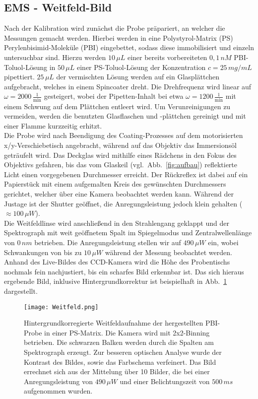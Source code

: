 \subsection{\label{subsec:A2}EMS - Weitfeld-Bild}
Nach der Kalibration wird zunächst die Probe präpariert, 
an welcher die Messungen gemacht werden. Hierbei werden in eine Polystyrol-Matrix (PS) 
Perylenbisimid-Moleküle (PBI) eingebettet, sodass diese immobilisiert und einzeln untersuchbar sind.
Hierzu werden $10\,\si{\mu L}$ einer bereits vorbereiteten $0,1\,\si{nM}$ PBI-Toluol-Lösung in 
$50\,\si{\mu L}$ einer PS-Toluol-Lösung der Konzentration $c=25\,\si{mg/mL}$ pipettiert. 
$25\,\si{\mu L}$ der vermischten Lösung werden auf ein Glasplättchen aufgebracht, welches in 
einem Spincoater dreht. Die Drehfrequenz wird linear auf $\omega=2000\,\si{\frac{1}{\text{min}}}$ 
gesteigert, wobei der Pipetten-Inhalt bei etwa $\omega=1200\,\si{\frac{1}{\text{min}}}$ mit 
einem Schwung auf dem Plättchen entleert wird. Um Verunreinigungen zu vermeiden, werden die benutzten 
Glasflaschen und -plättchen gereinigt und mit einer Flamme kurzzeitig erhitzt. \\
Die Probe wird nach Beendigung des Coating-Prozesses auf dem motorisierten x/y-Verschiebetisch angebracht, 
während auf das Objektiv das Immersionsöl geträufelt wird. Das Deckglas wird mithilfe eines Rädchens 
in den Fokus des Objektivs gefahren, bis das vom Glaskeil (vgl.~Abb.~\ref{fig:aufbau}) reflektierte Licht
einen vorgegebenen Durchmesser erreicht. Der Rückreflex ist dabei auf ein Papierstück mit einem aufgemalten 
Kreis des gewünschten Durchmessers gerichtet, welcher über eine Kamera beobachtet werden kann. 
Während der Justage ist der Shutter geöffnet, die Anregungsleistung jedoch klein gehalten 
($\approx 100\,\si{\mu W}$). \\
Die Weitfeldlinse wird anschließend in den Strahlengang geklappt und der Spektrograph mit weit 
geöffnetem Spalt im Spiegelmodus und Zentralwellenlänge von $0\,\si{nm}$ betrieben. 
Die Anregungsleistung stellen wir auf $490\,\si{\mu W}$ ein, 
wobei Schwankungen von bis zu $10\,\si{\mu W}$ während der Messung beobachtet werden. 
Anhand des Live-Bildes des CCD-Kamera wird die Höhe des Probentischs nochmals fein nachjustiert, 
bis ein scharfes Bild erkennbar ist. Das sich hieraus ergebende Bild, inklusive Hintergrundkorrektur
ist beispielhaft in Abb.~\ref{fig:weitfeldbild} dargestellt. 
\begin{figure}[h!]
    \centering
    \texttt{[image: Weitfeld.png]}
    \caption{\label{fig:weitfeldbild}Hintergrundkorregierte Weitfeldaufnahme der hergestellten 
    PBI-Probe in einer PS-Matrix. Die Kamera wird mit 2x2-Binning betrieben. Die schwarzen Balken 
    werden durch die Spalten am Spektrograph erzeugt. Zur besseren optischen Analyse wurde 
    der Kontrast des Bildes, sowie das Farbschema verfeinert.
    Das Bild errechnet sich aus der Mittelung über 10 Bilder, die bei einer Anregungsleistung von 
    $490\,\si{\mu W}$ und einer Belichtungszeit von $500\,\si{ms}$ aufgenommen wurden.}
\end{figure}\FloatBarrier
